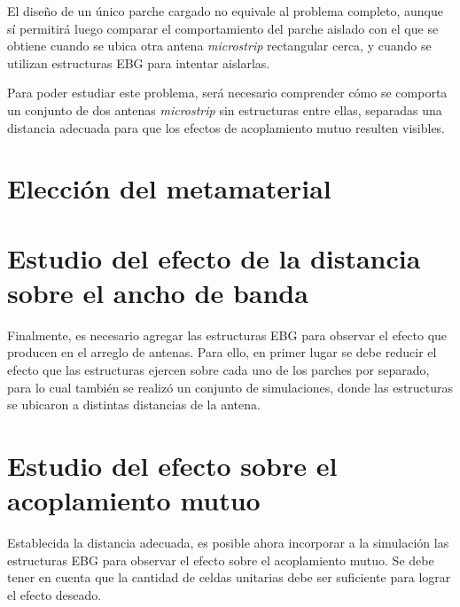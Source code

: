 
El diseño de un único parche cargado no equivale al problema completo, aunque sí permitirá luego comparar el comportamiento del parche aislado con el que se obtiene cuando se ubica otra antena \textit{microstrip} rectangular cerca, y cuando se utilizan estructuras EBG para intentar aislarlas.

Para poder estudiar este problema, será necesario comprender cómo se comporta un conjunto de dos antenas \textit{microstrip} sin estructuras entre ellas, separadas una distancia adecuada para que los efectos de acoplamiento mutuo resulten visibles.



\section{Elección del metamaterial}
\label{sec_eleccion}

\section{Estudio del efecto de la distancia sobre el ancho de banda}
\label{sec_efecto_distancia}

Finalmente, es necesario agregar las estructuras EBG para observar el efecto que producen en el arreglo de antenas. Para ello, en primer lugar se debe reducir el efecto que las estructuras ejercen sobre cada uno de los parches por separado, para lo cual también se realizó un conjunto de simulaciones, donde las estructuras se ubicaron a distintas distancias de la antena.

\section{Estudio del efecto sobre el acoplamiento mutuo}
\label{sec_estudio_acoplam_mutuo}
Establecida la distancia adecuada, es posible ahora incorporar a la simulación las estructuras EBG para observar el efecto sobre el acoplamiento mutuo. Se debe tener en cuenta que la cantidad de celdas unitarias debe ser suficiente para lograr el efecto deseado.




